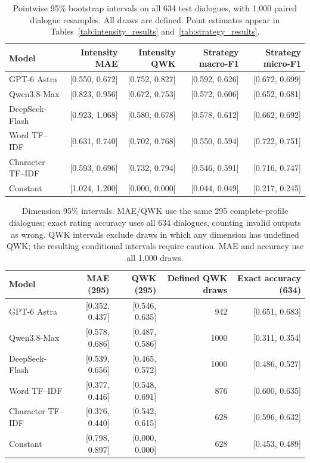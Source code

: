 \documentclass[11pt]{article}
\begin{document}
\begin{table}[t]
\centering\small
\setlength{\tabcolsep}{4pt}
\begin{tabular}{@{}lrrrr@{}}
\toprule
Model & Intensity MAE & Intensity QWK & Strategy macro-F1 & Strategy micro-F1\\
\midrule
GPT-6 Astra & [0.550, 0.672] & [0.752, 0.827] & [0.592, 0.626] & [0.672, 0.699]\\
Qwen3.8-Max & [0.823, 0.956] & [0.672, 0.753] & [0.572, 0.606] & [0.652, 0.681]\\
DeepSeek-Flash & [0.923, 1.068] & [0.580, 0.678] & [0.578, 0.612] & [0.662, 0.692]\\
Word TF--IDF & [0.631, 0.740] & [0.702, 0.768] & [0.550, 0.594] & [0.722, 0.751]\\
Character TF--IDF & [0.593, 0.696] & [0.732, 0.794] & [0.546, 0.591] & [0.716, 0.747]\\
Constant & [1.024, 1.200] & [0.000, 0.000] & [0.044, 0.049] & [0.217, 0.245]\\
\bottomrule
\end{tabular}
\caption{Pointwise 95\% bootstrap intervals on all 634 test dialogues, with 1,000 paired dialogue resamples. All draws are defined. Point estimates appear in Tables~\ref{tab:intensity_results} and~\ref{tab:strategy_results}.}
\label{tab:ordinal_strategy_ci}
\end{table}
\begin{table}[t]
\centering\small
\setlength{\tabcolsep}{4pt}
\begin{tabular}{@{}lrrrr@{}}
\toprule
Model & MAE (295) & QWK (295) & Defined QWK draws & Exact accuracy (634)\\
\midrule
GPT-6 Astra & [0.352, 0.437] & [0.546, 0.635] & 942 & [0.651, 0.683]\\
Qwen3.8-Max & [0.578, 0.686] & [0.487, 0.586] & 1000 & [0.311, 0.354]\\
DeepSeek-Flash & [0.539, 0.656] & [0.465, 0.572] & 1000 & [0.486, 0.527]\\
Word TF--IDF & [0.377, 0.446] & [0.548, 0.691] & 876 & [0.600, 0.635]\\
Character TF--IDF & [0.376, 0.440] & [0.542, 0.615] & 628 & [0.596, 0.632]\\
Constant & [0.798, 0.897] & [0.000, 0.000] & 628 & [0.453, 0.489]\\
\bottomrule
\end{tabular}
\caption{Dimension 95\% intervals. MAE/QWK use the same 295 complete-profile dialogues; exact rating accuracy uses all 634 dialogues, counting invalid outputs as wrong. QWK intervals exclude draws in which any dimension has undefined QWK; the resulting conditional intervals require caution. MAE and accuracy use all 1,000 draws.}
\label{tab:dimension_ci}
\end{table}
\end{document}
